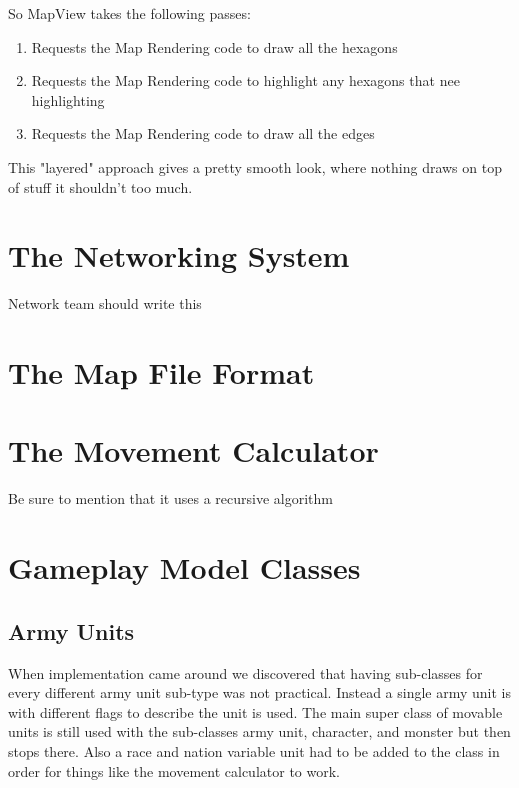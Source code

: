 \documentclass[12pt,a4paper]{article}
\begin{document}
So MapView takes the following passes:
\begin{enumerate}
\item{Requests the Map Rendering code to draw all the hexagons}
\item{Requests the Map Rendering code to highlight any hexagons that nee
      highlighting}
\item{Requests the Map Rendering code to draw all the edges}
\end{enumerate}

This "layered" approach gives a pretty smooth look, where nothing draws on top
of stuff it shouldn't too much.

\section{The Networking System}
Network team should write this

\section{The Map File Format}

\section{The Movement Calculator}
Be sure to mention that it uses a recursive algorithm

\section{Gameplay Model Classes}
\subsection{Army Units}
When implementation came around we discovered that having sub-classes for every 
different army unit sub-type was not practical. Instead a single army unit is 
with different flags to describe the unit is used. The main super class of 
movable units is still used with the sub-classes army unit, character, and 
monster but then stops there. Also a race and nation variable unit had to be 
added to the class in order for things like the movement calculator to work. 
\end{document}
